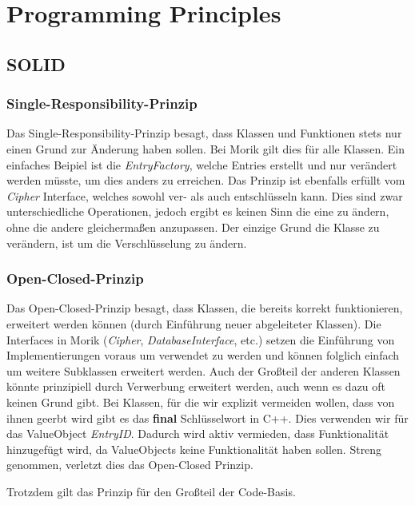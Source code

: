 \chapter{Programming Principles}

\section{SOLID}

\subsection{Single-Responsibility-Prinzip}

Das Single-Responsibility-Prinzip besagt, dass Klassen und Funktionen stets nur einen Grund zur Änderung haben sollen. Bei Morik gilt dies für alle Klassen. Ein einfaches Beipiel ist die \textit{EntryFactory}, welche Entries erstellt und nur verändert werden müsste, um dies anders zu erreichen. Das Prinzip ist ebenfalls erfüllt vom \textit{Cipher} Interface, welches sowohl ver- als auch entschlüsseln kann. Dies sind zwar unterschiedliche Operationen, jedoch ergibt es keinen Sinn die eine zu ändern, ohne die andere gleichermaßen anzupassen. Der einzige Grund die Klasse zu verändern, ist um die Verschlüsselung zu ändern.

\subsection{Open-Closed-Prinzip}

Das Open-Closed-Prinzip besagt, dass Klassen, die bereits korrekt funktionieren, erweitert werden können (durch Einführung neuer abgeleiteter Klassen). 
Die Interfaces in Morik (\textit{Cipher}, \textit{DatabaseInterface}, etc.) setzen die Einführung von Implementierungen voraus um verwendet zu werden und können folglich einfach um weitere Subklassen erweitert werden. Auch der Großteil der anderen Klassen könnte prinzipiell durch Verwerbung erweitert werden, auch wenn es dazu oft keinen Grund gibt. Bei Klassen, für die wir explizit vermeiden wollen, dass von ihnen geerbt wird gibt es das \textbf{final} Schlüsselwort in C++. Dies verwenden wir \zB für das ValueObject \textit{EntryID}. Dadurch wird aktiv vermieden, dass Funktionalität hinzugefügt wird, da ValueObjects keine Funktionalität haben sollen. Streng genommen, verletzt dies das Open-Closed Prinzip.

Trotzdem gilt das Prinzip für den Großteil der Code-Basis.

